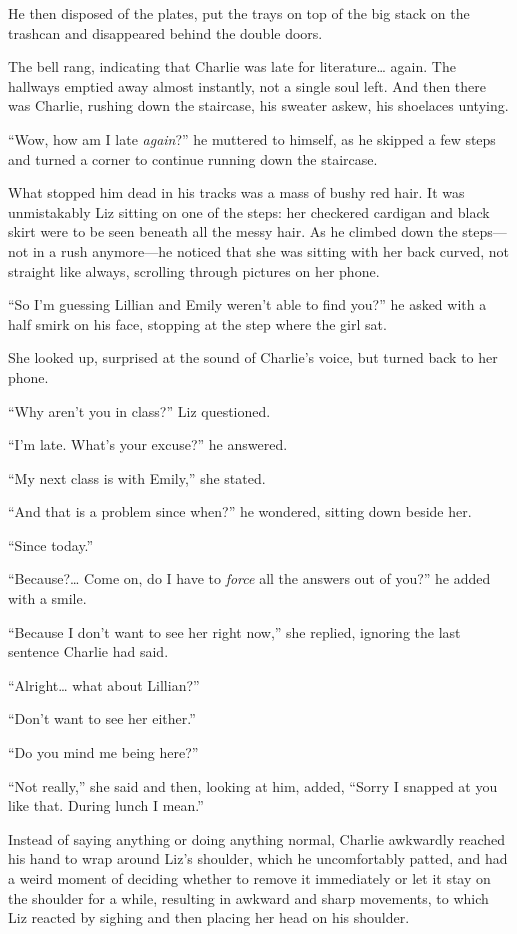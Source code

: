 He then disposed of the plates, put the trays on top of the big stack on the trashcan and disappeared behind the double doors.

\bigskip

The bell rang, indicating that Charlie was late for literature… again. The hallways emptied away almost instantly, not a single soul left. And then there was Charlie, rushing down the staircase, his sweater askew, his shoelaces untying.

“Wow, how am I late \textit{again}?” he muttered to himself, as he skipped a few steps and turned a corner to continue running down the staircase.

What stopped him dead in his tracks was a mass of bushy red hair. It was unmistakably Liz sitting on one of the steps: her checkered cardigan and black skirt were to be seen beneath all the messy hair. As he climbed down the steps—not in a rush anymore—he noticed that she was sitting with her back curved, not straight like always, scrolling through pictures on her phone.

“So I'm guessing Lillian and Emily weren't able to find you?” he asked with a half smirk on his face, stopping at the step where the girl sat.

She looked up, surprised at the sound of Charlie's voice, but turned back to her phone.

“Why aren't you in class?” Liz questioned.

“I'm late. What's your excuse?” he answered.

“My next class is with Emily,” she stated.

“And that is a problem since when?” he wondered, sitting down beside her.

“Since today.”

“Because?… Come on, do I have to \textit{force} all the answers out of you?” he added with a smile.

“Because I don't want to see her right now,” she replied, ignoring the last sentence Charlie had said.

“Alright… what about Lillian?”

“Don't want to see her either.”

“Do you mind me being here?”

“Not really,” she said and then, looking at him, added, “Sorry I snapped at you like that. During lunch I mean.”

Instead of saying anything or doing anything normal, Charlie awkwardly reached his hand to wrap around Liz's shoulder, which he uncomfortably patted, and had a weird moment of deciding whether to remove it immediately or let it stay on the shoulder for a while, resulting in awkward and sharp movements, to which Liz reacted by sighing and then placing her head on his shoulder.


